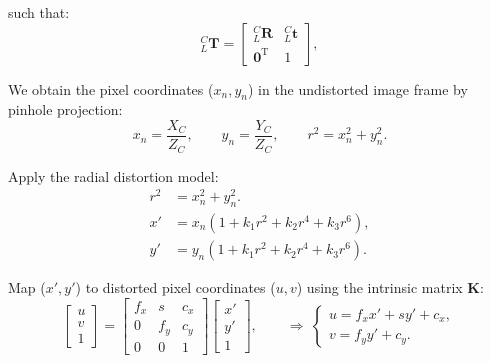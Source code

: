 \documentclass{erauthesis}
\begin{document}
such that:
\begin{equation*}
    _{L}^{C}\mathbf{T} =
    \begin{bmatrix}
        _{L}^{C}\mathbf{R} & _{L}^{C}\mathbf{t} \\
        \mathbf{0}^\mathrm{T} & 1
    \end{bmatrix},
\end{equation*}

We obtain the pixel coordinates ($x_n, y_n$) in the undistorted image frame by pinhole projection:
\begin{equation*}
x_n = \frac{X_C}{Z_C}, \qquad
y_n = \frac{Y_C}{Z_C}, \qquad
r^2 = x_n^2 + y_n^2 .
\label{eq:normalized_coords}
\end{equation*}

Apply the radial distortion model:
\begin{align*}
r^2 & = x_n^2 + y_n^2 .\\
x' & = x_n\!\left(1 + k_1 r^2 + k_2 r^4 + k_3 r^6\right), \\
y' & = y_n\!\left(1 + k_1 r^2 + k_2 r^4 + k_3 r^6\right).
\label{eq:radial_distortion_apply}
\end{align*}

Map ($x', y'$) to distorted pixel coordinates ($u,v$) using the intrinsic matrix $\mathbf{K}$:
\begin{equation}
\begin{bmatrix} u \\ v \\ 1 \end{bmatrix}
=
\begin{bmatrix}
f_x & s & c_x \\
0   & f_y & c_y \\
0   & 0   & 1
\end{bmatrix}
\begin{bmatrix} x' \\ y' \\ 1 \end{bmatrix},
\qquad
\Rightarrow\ 
\begin{cases}
u = f_x x' + s y' + c_x,\\
v = f_y y' + c_y.
\end{cases}
\label{eq:intrinsics_to_pixels}
\end{equation}


%        
\end{document}
